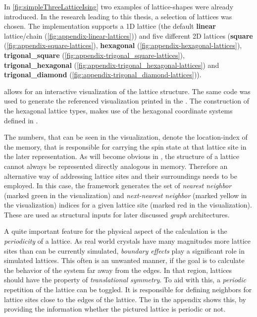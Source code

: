In \autoref{fig:simpleThreeLatticeIsing} two examples of lattice-shapes were already introduced.
In the research leading to this thesis, a selection of lattices was chosen.
The implementation supports a 1D lattice (the default \textbf{linear} lattice/chain  (\autoref{fig:appendix-linear-lattices})) and five different 2D lattices 
(\textbf{square} (\autoref{fig:appendix-square-lattices}), \textbf{hexagonal} (\autoref{fig:appendix-hexagonal-lattices}), \textbf{trigonal\_square} (\autoref{fig:appendix-trigonal_square-lattices}), \textbf{trigonal\_hexagonal} (\autoref{fig:appendix-trigonal_hexagonal-lattices}) and \textbf{trigonal\_diamond} (\autoref{fig:appendix-trigonal_diamond-lattices})).

 allows for an interactive visualization of the lattice structure.
The same code was used to generate the referenced visualization printed in the .
The construction of the hexagonal lattice types, makes use of the hexagonal coordinate systems defined in \cite[]{hexagonalGrids}.

The numbers, that can be seen in the visualization, denote the location-index of the memory, that is responsible for carrying the spin state at that lattice site in the later representation. As will become obvious in , the structure of a lattice cannot always be represented directly analogous in memory. Therefore an alternative way of addressing lattice sites and their surroundings needs to be employed.
In this case, the framework generates the set of \emph{nearest neighbor} (marked green in the visualization) and \emph{next-nearest neighbor} (marked yellow in the visualization) indices for a given lattice site (marked red in the visualization). These are used as structural inputs for later discussed \emph{graph} architectures.

A quite important feature for the physical aspect of the calculation is the \emph{periodicity} of a lattice. 
As real world crystals have many magnitudes more lattice sites than can be currently simulated, \emph{boundary effects} play a significant role in simulated lattices.
This often is an unwanted manner, if the goal is to calculate the behavior of the system far away from the edges. 
In that region, lattices should have the property of \emph{translational symmetry}. 
To aid with this, a \emph{periodic} repetition of the lattice can be toggled. 
It is responsible for defining neighbors for lattice sites close to the edges of the lattice.
The  in the appendix shows this, by providing the information whether the pictured lattice is periodic or not.

